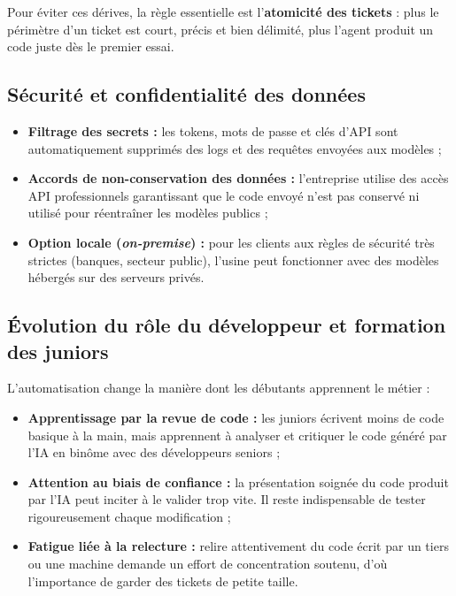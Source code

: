 \documentclass{tnreport}
\begin{document}
Pour éviter ces dérives, la règle essentielle est l'\textbf{atomicité des tickets} : plus le périmètre d'un ticket est court, précis et bien délimité, plus l'agent produit un code juste dès le premier essai.

\subsection{Sécurité et confidentialité des données}
\label{subsec:securite_confidentialite_gouvernance}

\begin{itemize}
    \item \textbf{Filtrage des secrets :} les tokens, mots de passe et clés d'API sont automatiquement supprimés des logs et des requêtes envoyées aux modèles ;
    \item \textbf{Accords de non-conservation des données :} l'entreprise utilise des accès API professionnels garantissant que le code envoyé n'est pas conservé ni utilisé pour réentraîner les modèles publics ;
    \item \textbf{Option locale (\textit{on-premise}) :} pour les clients aux règles de sécurité très strictes (banques, secteur public), l'usine peut fonctionner avec des modèles hébergés sur des serveurs privés.
\end{itemize}

\subsection{Évolution du rôle du développeur et formation des juniors}
\label{subsec:impacts_humains_transmission}

L'automatisation change la manière dont les débutants apprennent le métier :
\begin{itemize}
    \item \textbf{Apprentissage par la revue de code :} les juniors écrivent moins de code basique à la main, mais apprennent à analyser et critiquer le code généré par l'IA en binôme avec des développeurs seniors ;
    \item \textbf{Attention au biais de confiance :} la présentation soignée du code produit par l'IA peut inciter à le valider trop vite. Il reste indispensable de tester rigoureusement chaque modification ;
    \item \textbf{Fatigue liée à la relecture :} relire attentivement du code écrit par un tiers ou une machine demande un effort de concentration soutenu, d'où l'importance de garder des tickets de petite taille.
\end{itemize}
\end{document}
